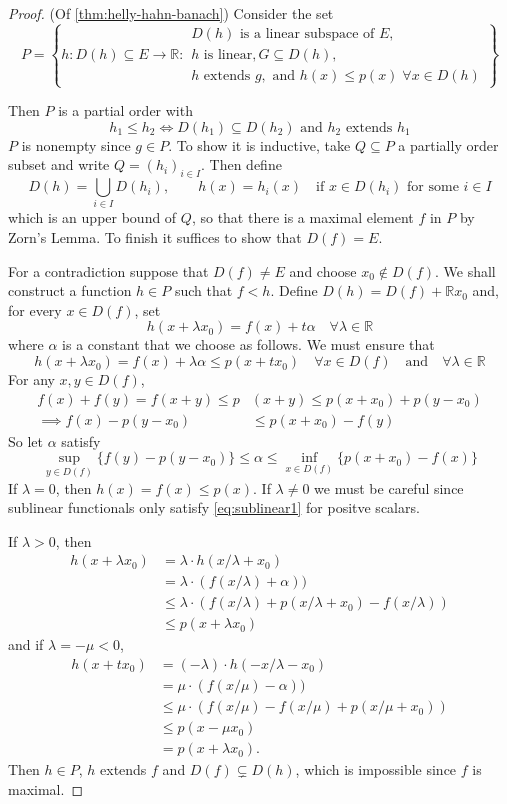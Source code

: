 \documentclass{article}
\theoremstyle{definition}
\numberwithin{equation}{section}
\newcommand{\R}{\mathbb{R}}
\begin{document}
\begin{proof} (Of \cref{thm:helly-hahn-banach})
	Consider the set
	\[P=\left\{h:D(h)\subseteq E\to\R:\substack{D(h)\text{ is a linear subspace of }E,\\
	h\text{ is linear},G\subseteq D(h),\\
	h\text{ extends }g,\text{ and }h(x)\leq p(x)\;\forall x\in D(h)
	}\right\}\]

Then $P$ is a partial order with
\[h_1\leq h_2\iff D(h_1)\subseteq D(h_2)\text{ and }h_2\text{ extends }h_1\]
$P$ is nonempty since $g\in P$. To show it is inductive, take $Q\subseteq P$ a partially order subset and write $Q=(h_i)_{i\in I}$. Then define
\[D(h)=\bigcup_{i\in I}D(h_i),\qquad h(x)=h_i(x)\quad\text{if }x\in D(h_i) \text{ for some }i\in I\]
which is an upper bound of $Q$, so that there is a maximal element $f$ in $P$ by Zorn's Lemma. To finish it suffices to show that $D(f)=E$.

For a contradiction suppose that $D(f)\neq E$ and choose $x_0\notin D(f)$. We shall construct a function $h\in P$ such that $f<h$. Define $D(h)=D(f)+\R x_0$ and, for every $x\in D(f)$, set
 \[h(x+\lambda x_0)=f(x)+t\alpha\quad \forall \lambda\in\R\]
 where $\alpha$ is a constant that we choose as follows. We must ensure that
\[h(x+\lambda x_0)=f(x)+\lambda\alpha\leq p(x+tx_0)\quad\forall x\in D(f)\quad\text{and}\quad\forall \lambda\in\R\]
For any $x,y\in D(f)$,
\begin{align*}
	f(x)+f(y)=f(x+y)\leq p&(x+y)\leq p(x+x_0)+p(y-x_0)\\
	\implies f(x)-p(y-x_0)&\leq p(x+x_0)-f(y)
\end{align*}
So let $\alpha$ satisfy
\[\sup_{y\in D(f)}\{f(y)-p(y-x_0)\}\leq\alpha\leq\inf_{x\in D(f)}\{p(x+x_0)-f(x)\}\]
If $\lambda =0$, then $h(x)=f(x)\leq p(x)$. If $\lambda\neq0$ we must be careful since sublinear functionals only satisfy \cref{eq:sublinear1} for positve scalars.

If $\lambda >0$, then 
\begin{align*}
	h(x+\lambda x_0)&=\lambda\cdot h(x/\lambda+x_0)\\
	&=\lambda\cdot(f(x/\lambda)+\alpha))\\
	&\leq \lambda\cdot(f(x/\lambda)+p(x/\lambda+x_0)-f(x/\lambda))\\
	&\leq p(x+\lambda x_0)
\end{align*}
and if $\lambda=-\mu<0$,
\begin{align*}
	h(x+tx_0)&=(-\lambda)\cdot h(-x/\lambda-x_0)\\
	&=\mu\cdot(f(x/\mu)-\alpha))\\
	&\leq \mu\cdot(f(x/\mu)-f(x/\mu)+p(x/\mu+x_0))\\
	&\leq p(x-\mu x_0)\\
	&=p(x+\lambda x_0).
\end{align*}
Then $h\in P$, $h$ extends $f$ and $D(f)\subsetneq D(h)$, which is impossible since $f$ is maximal.
\end{proof}
\end{document}
